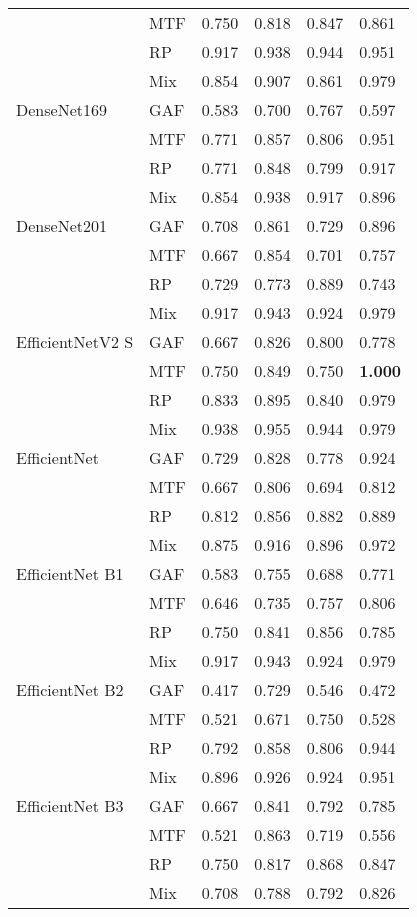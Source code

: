 \begin{longtable}[t]{llllll}
 & MTF & 0.750 & 0.818 & 0.847 & 0.861 \\
 & RP & 0.917 & 0.938 & 0.944 & 0.951 \\
 & Mix & 0.854 & 0.907 & 0.861 & 0.979 \\
DenseNet169 & GAF & 0.583 & 0.700 & 0.767 & 0.597 \\
 & MTF & 0.771 & 0.857 & 0.806 & 0.951 \\
 & RP & 0.771 & 0.848 & 0.799 & 0.917 \\
 & Mix & 0.854 & 0.938 & 0.917 & 0.896 \\
DenseNet201 & GAF & 0.708 & 0.861 & 0.729 & 0.896 \\
 & MTF & 0.667 & 0.854 & 0.701 & 0.757 \\
 & RP & 0.729 & 0.773 & 0.889 & 0.743 \\
 & Mix & 0.917 & 0.943 & 0.924 & 0.979 \\
EfficientNetV2 S & GAF & 0.667 & 0.826 & 0.800 & 0.778 \\
 & MTF & 0.750 & 0.849 & 0.750 & \textbf{1.000} \\
 & RP & 0.833 & 0.895 & 0.840 & 0.979 \\
 & Mix & 0.938 & 0.955 & 0.944 & 0.979 \\
EfficientNet & GAF & 0.729 & 0.828 & 0.778 & 0.924 \\
 & MTF & 0.667 & 0.806 & 0.694 & 0.812 \\
 & RP & 0.812 & 0.856 & 0.882 & 0.889 \\
 & Mix & 0.875 & 0.916 & 0.896 & 0.972 \\
EfficientNet B1 & GAF & 0.583 & 0.755 & 0.688 & 0.771 \\
 & MTF & 0.646 & 0.735 & 0.757 & 0.806 \\
 & RP & 0.750 & 0.841 & 0.856 & 0.785 \\
 & Mix & 0.917 & 0.943 & 0.924 & 0.979 \\
EfficientNet B2 & GAF & 0.417 & 0.729 & 0.546 & 0.472 \\
 & MTF & 0.521 & 0.671 & 0.750 & 0.528 \\
 & RP & 0.792 & 0.858 & 0.806 & 0.944 \\
 & Mix & 0.896 & 0.926 & 0.924 & 0.951 \\
EfficientNet B3 & GAF & 0.667 & 0.841 & 0.792 & 0.785 \\
 & MTF & 0.521 & 0.863 & 0.719 & 0.556 \\
 & RP & 0.750 & 0.817 & 0.868 & 0.847 \\
 & Mix & 0.708 & 0.788 & 0.792 & 0.826 \\

\end{longtable}
